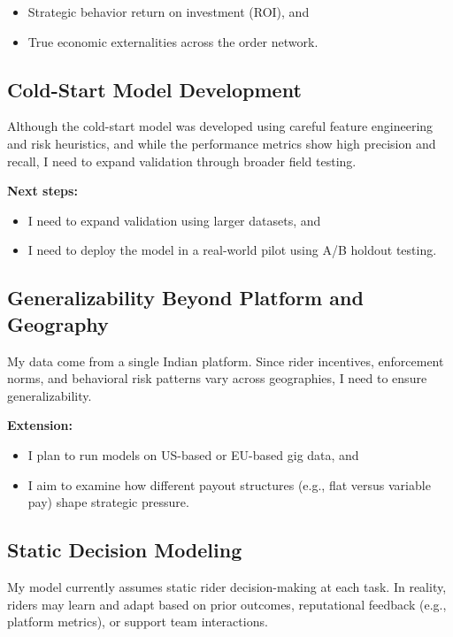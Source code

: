 \documentclass[12pt,letterpaper]{article}
\begin{document}
\begin{itemize}
    \item Strategic behavior return on investment (ROI), and
    \item True economic externalities across the order network.
\end{itemize}

\subsection{Cold-Start Model Development}

Although the cold-start model was developed using careful feature engineering and risk heuristics, and while the performance metrics show high precision and recall, I need to expand validation through broader field testing.

\textbf{Next steps:}
\begin{itemize}
    \item I need to expand validation using larger datasets, and
    \item I need to deploy the model in a real-world pilot using A/B holdout testing.
\end{itemize}

\subsection{Generalizability Beyond Platform and Geography}

My data come from a single Indian platform. Since rider incentives, enforcement norms, and behavioral risk patterns vary across geographies, I need to ensure generalizability.

\textbf{Extension:}
\begin{itemize}
    \item I plan to run models on US-based or EU-based gig data, and
    \item I aim to examine how different payout structures (e.g., flat versus variable pay) shape strategic pressure.
\end{itemize}

\subsection{Static Decision Modeling}

My model currently assumes static rider decision-making at each task. In reality, riders may learn and adapt based on prior outcomes, reputational feedback (e.g., platform metrics), or support team interactions.
\end{document}
